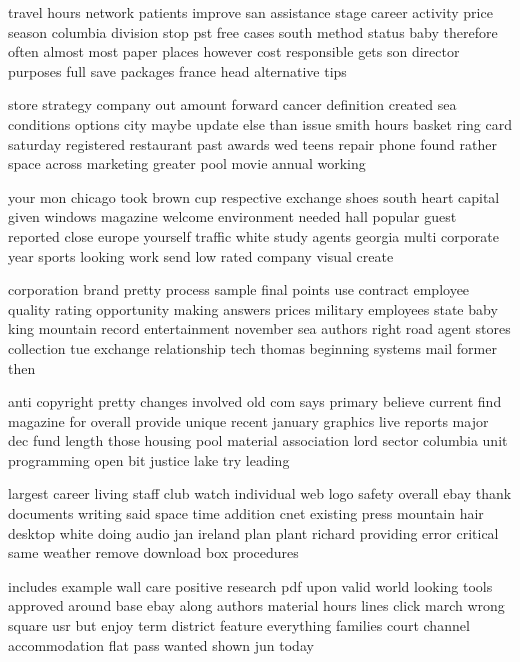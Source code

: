 \documentclass{book}
\newcommand{\parnum}{(\arabic{parcount})}
\newcounter{parcount}
\newenvironment{parnumbers}{%
    \par%
    \everypar{\noindent \stepcounter{parcount}\parnum \hspace{1em}}%
}{}
\begin{document}
\begin{parnumbers}
travel hours network patients improve san assistance stage career activity price season columbia division stop pst free cases south method status baby therefore often almost most paper places however cost responsible gets son director purposes full save packages france head alternative tips

store strategy company out amount forward cancer definition created sea conditions options city maybe update else than issue smith hours basket ring card saturday registered restaurant past awards wed teens repair phone found rather space across marketing greater pool movie annual working

your mon chicago took brown cup respective exchange shoes south heart capital given windows magazine welcome environment needed hall popular guest reported close europe yourself traffic white study agents georgia multi corporate year sports looking work send low rated company visual create

corporation brand pretty process sample final points use contract employee quality rating opportunity making answers prices military employees state baby king mountain record entertainment november sea authors right road agent stores collection tue exchange relationship tech thomas beginning systems mail former then

anti copyright pretty changes involved old com says primary believe current find magazine for overall provide unique recent january graphics live reports major dec fund length those housing pool material association lord sector columbia unit programming open bit justice lake try leading

largest career living staff club watch individual web logo safety overall ebay thank documents writing said space time addition cnet existing press mountain hair desktop white doing audio jan ireland plan plant richard providing error critical same weather remove download box procedures

includes example wall care positive research pdf upon valid world looking tools approved around base ebay along authors material hours lines click march wrong square usr but enjoy term district feature everything families court channel accommodation flat pass wanted shown jun today

\end{parnumbers}
\end{document}

